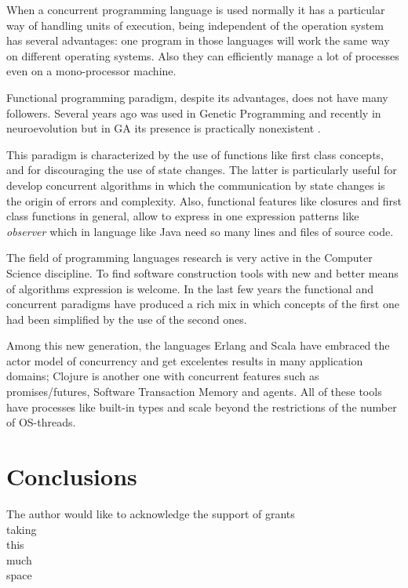 \documentclass[sigconf]{acmart}
\begin{document}
When a concurrent programming language is used normally it has a
particular way of handling units of execution, being independent of
the operation system has several advantages: one program in those
languages will work the same way on different operating systems. Also
they can efficiently manage a lot of processes even on a
mono-processor machine.


Functional programming paradigm, despite its advantages, does not have
many followers. Several years ago was used in Genetic Programming
\cite{Briggs:2008:FGP:1375341.1375345,Huelsbergen:1996:TSE:1595536.1595579,walsh:1999:AFSFESIHLP}
and recently in neuroevolution \cite{Sher2013} but in GA its presence
is practically nonexistent \cite{Hawkins:2001:GFG:872017.872197}. 

This paradigm is characterized by the use of functions like first
class concepts, and for discouraging the use of state changes. The
latter is particularly useful for develop concurrent algorithms in
which the communication by state changes is the origin of errors and
complexity. Also, functional features like closures and first class
functions in general, allow to express in one expression patterns like
\emph{observer} which in language like Java need so many lines and
files of source code.


The field of programming languages research is very active in the
Computer Science discipline. To find software construction tools with
new and better means of algorithms expression is welcome. In the last
few years the functional and concurrent paradigms have produced a rich
mix in which concepts of the first one had been simplified by the use
of the second ones. 

Among this new generation, the languages Erlang and Scala have
embraced the actor model of concurrency and get excelentes results in
many application domains; Clojure is another one with concurrent
features such as promises/futures, Software Transaction Memory and
agents. All of these tools have processes like built-in types and
scale beyond the restrictions of the number of OS-threads.

\section{Conclusions}
\label{sec:conclusions}

\begin{acks}

  The author would like to acknowledge the support of grants\\
  taking\\
  this\\
  much\\
  space\\

\end{acks}




\end{document}
